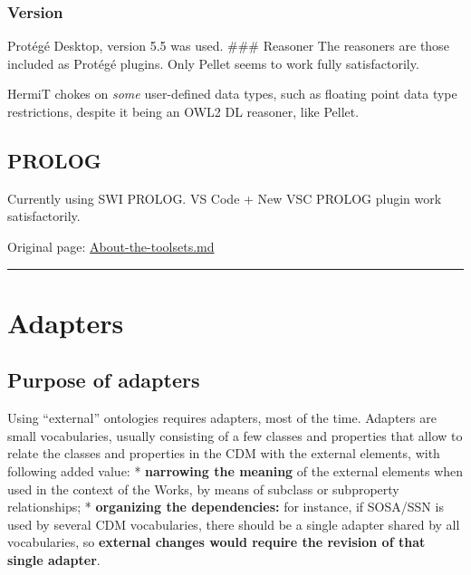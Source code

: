 \documentclass[
  11pt,
]{article}
\begin{document}
\hypertarget{version-1}{%
\subsubsection{Version}\label{version-1}}

Protégé Desktop, version 5.5 was used. \#\#\# Reasoner The reasoners are
those included as Protégé plugins. Only Pellet seems to work fully
satisfactorily.

HermiT chokes on \emph{some} user-defined data types, such as floating
point data type restrictions, despite it being an OWL2 DL reasoner, like
Pellet.

\hypertarget{prolog}{%
\subsection{PROLOG}\label{prolog}}

Currently using SWI PROLOG. VS Code + New VSC PROLOG plugin work
satisfactorily.

Original page:
\href{https://github.com/UICrail/CDM-RSM/wiki/About-the-toolsets}{About-the-toolsets.md}

\begin{center}\rule{0.5\linewidth}{0.5pt}\end{center}

\hypertarget{adapters}{%
\section{Adapters}\label{adapters}}

\hypertarget{purpose-of-adapters}{%
\subsection{Purpose of adapters}\label{purpose-of-adapters}}

Using ``external'' ontologies requires adapters, most of the time.
Adapters are small vocabularies, usually consisting of a few classes and
properties that allow to relate the classes and properties in the CDM
with the external elements, with following added value: *
\textbf{narrowing the meaning} of the external elements when used in the
context of the Works, by means of subclass or subproperty relationships;
* \textbf{organizing the dependencies:} for instance, if SOSA/SSN is
used by several CDM vocabularies, there should be a single adapter
shared by all vocabularies, so \textbf{external changes would require
the revision of that single adapter}.
\end{document}
